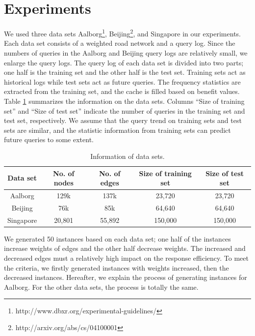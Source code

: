 \section{Experiments }
\label{sec:exp}

We used three data sets Aalborg\footnote{http://www.dbxr.org/experimental-guidelines/}, Beijing\footnote{http://arxiv.org/abs/cs/04100001}, and Singapore \citep{Song2014PRESS} in our experiments. Each data set consists of a weighted road network and a query log. Since the numbers of queries in the Aalborg and Beijing query logs are relatively small, we enlarge the query logs.
The query log of each data set is divided into two parts; one half is the training set and the other half is the test set. Training sets act as historical logs while test sets act as future queries. The frequency statistics are extracted from the training set, and the cache is filled based on benefit values.
Table \ref{tab:datasetinfo} summarizes the information on the data sets. Columns ``Size of training set'' and ``Size of test set'' indicate the number of queries in the training set and test set, respectively. We assume that the query trend on training sets and test sets are similar, and the statistic information from training sets can predict future queries to some extent.

 \begin{table}[htbp]
 \caption{Information of data sets.}
 \centering
 \label{tab:datasetinfo}
{
 \begin{tabular}{c|c|c|c|c}
 \hline
  Data set   & No. of nodes & No. of edges & Size of training set & Size of test set\\
  \hline
  Aalborg    & 129k         & 137k         &23,720                            & 23,720\\
  \hline
   Beijing   & 76k          &85k           &64,640                            & 64,640\\
  \hline
   Singapore & 20,801       &55,892        &150,000                           & 150,000\\
   \hline
 \end{tabular}
}
\end{table}

We generated 50 instances based on each data set; one half of the instances increase weights of edges and the other half decrease weights. The increased and decreased edges must a relatively high impact on the response efficiency.
To meet the criteria, we firstly generated instances with weights increased, then the decreased instances. Hereafter, we explain the process of generating instances for Aalborg. For the other data sets, the process is totally the same.

